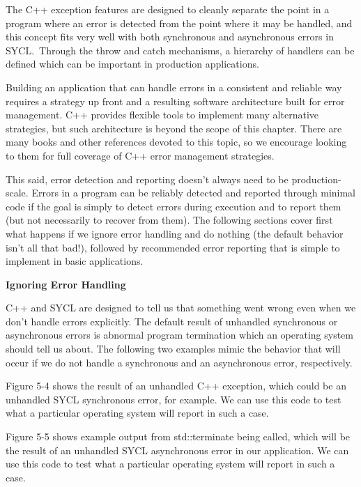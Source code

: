 The C++ exception features are designed to cleanly separate the point in a program where an error is detected from the point where it may be handled, and this concept fits very well with both synchronous and asynchronous errors in SYCL. Through the throw and catch mechanisms, a hierarchy of handlers can be defined which can be important in production applications.\par

Building an application that can handle errors in a consistent and reliable way requires a strategy up front and a resulting software architecture built for error management. C++ provides flexible tools to implement many alternative strategies, but such architecture is beyond the scope of this chapter. There are many books and other references devoted to this topic, so we encourage looking to them for full coverage of C++ error management strategies.\par

This said, error detection and reporting doesn’t always need to be production-scale. Errors in a program can be reliably detected and reported through minimal code if the goal is simply to detect errors during execution and to report them (but not necessarily to recover from them). The following sections cover first what happens if we ignore error handling and do nothing (the default behavior isn’t all that bad!), followed by recommended error reporting that is simple to implement in basic applications.\par

\hspace*{\fill} \par %
\textbf{Ignoring Error Handling}

C++ and SYCL are designed to tell us that something went wrong even when we don’t handle errors explicitly. The default result of unhandled synchronous or asynchronous errors is abnormal program termination which an operating system should tell us about. The following two examples mimic the behavior that will occur if we do not handle a synchronous and an asynchronous error, respectively.\par

Figure 5-4 shows the result of an unhandled C++ exception, which could be an unhandled SYCL synchronous error, for example. We can use this code to test what a particular operating system will report in such a case.\par

Figure 5-5 shows example output from std::terminate being called, which will be the result of an unhandled SYCL asynchronous error in our application. We can use this code to test what a particular operating system will report in such a case.\par

